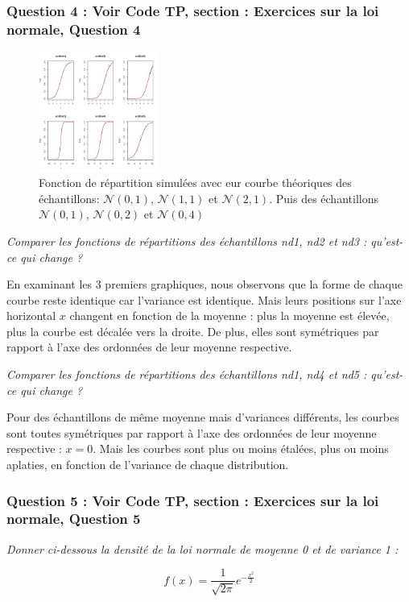         \subsubsection{Question 4 : Voir Code TP, section : Exercices sur la loi normale, Question 4 \cite{TP}}
            \begin{figure}[H]
                \centering
                \includegraphics[width=0.35\textwidth]{4_attachments/figures/output25.png}
                \caption{Fonction de répartition simulées avec eur courbe théoriques des échantillons: $\mathcal N(0,1)$, $\mathcal N(1,1)$ et $\mathcal N(2,1)$. Puis des échantillons $\mathcal N(0,1)$, $\mathcal N(0,2)$ et $\mathcal N(0,4)$}
                \label{fig:comparaison}
            \end{figure}
            \begin{center}
                \textit{Comparer les fonctions de répartitions des échantillons nd1, nd2 et nd3 : qu’est-ce qui change ?}
            \end{center}
               En examinant les 3 premiers graphiques, nous observons que la forme de chaque courbe reste identique car l'variance est identique. 
               Mais leurs positions sur l'axe horizontal $x$ changent en fonction de la moyenne : plus la moyenne est élevée, plus la courbe est décalée vers la droite. 
               De plus, elles sont symétriques par rapport à l’axe des ordonnées de leur moyenne respective.
            \begin{center}
                \textit{Comparer les fonctions de répartitions des échantillons nd1, nd4 et nd5 : qu’est-ce qui change ?}
            \end{center}
            Pour des échantillons de même moyenne mais d'variances différents, les courbes sont toutes symétriques par rapport à l’axe des ordonnées de leur moyenne respective : $x=0$.
            Mais les courbes sont plus ou moins étalées, plus ou moins aplaties, en fonction de l'variance de chaque distribution.
        \subsubsection{Question 5 : Voir Code TP, section : Exercices sur la loi normale, Question 5 \cite{TP}}
            \begin{center}
                \textit{Donner ci-dessous la densité de la loi normale de moyenne 0 et de variance 1 :}
            \end{center}
            \[
                f(x) = \dfrac{1}{\sqrt{2\pi}}e^{-\frac{x^2}{2}}
            \]

